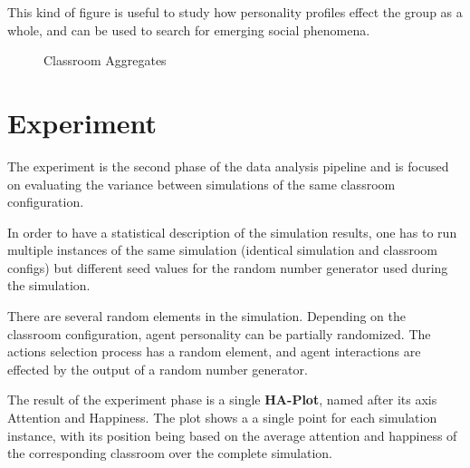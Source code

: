 This kind of figure is useful to study how personality profiles effect the group
as a whole, and can be used to search for emerging social phenomena.

\begin{figure}[]
    \label{ClassroomAggregates}
    \caption{Classroom Aggregates}
    \hspace*{-1.0\leftmargin}
\end{figure}



\section{Experiment}
The experiment is the second phase of the data analysis pipeline and is focused
on evaluating the variance between simulations of the same classroom configuration.

\begin{figure}[H]
\end{figure}

In order to have a statistical description of the simulation results, one has to
run multiple instances of the same simulation (identical simulation  and classroom
configs) but different seed values for the random number generator used during the simulation.

There are several random elements in the simulation. Depending on the classroom
configuration, agent personality can be partially randomized. The actions selection
process has a random element, and agent interactions are effected by the output of
a random number generator.

\bb

The result of the experiment phase is a single \textbf{HA-Plot}, named after
its axis Attention and Happiness. The plot shows a a single point for each simulation
instance, with its position being based on the average attention and happiness of
the corresponding classroom over the complete simulation.

